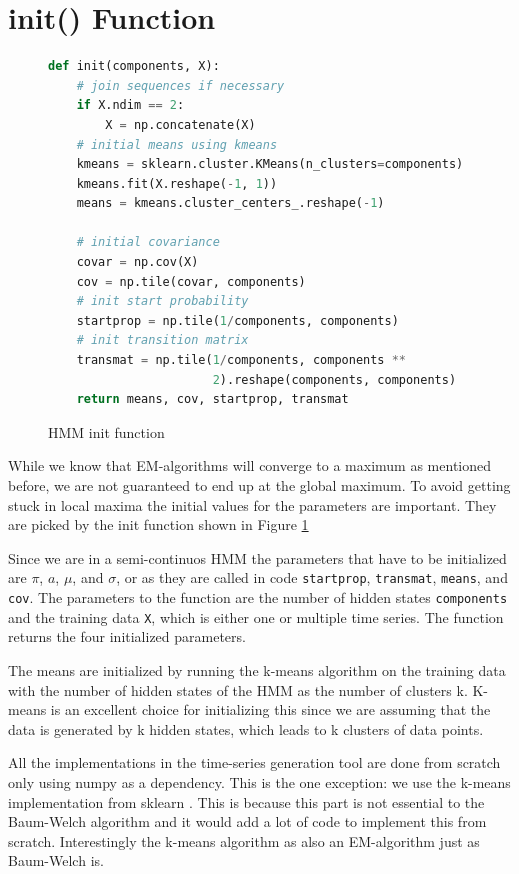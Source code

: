 \section{init() Function}

\begin{figure}
\begin{singlespace}
\begin{lstlisting}[language=Python]
def init(components, X):
    # join sequences if necessary
    if X.ndim == 2:
        X = np.concatenate(X)
    # initial means using kmeans
    kmeans = sklearn.cluster.KMeans(n_clusters=components)
    kmeans.fit(X.reshape(-1, 1))
    means = kmeans.cluster_centers_.reshape(-1)

    # initial covariance
    covar = np.cov(X)
    cov = np.tile(covar, components)
    # init start probability
    startprop = np.tile(1/components, components)
    # init transition matrix
    transmat = np.tile(1/components, components **
                       2).reshape(components, components)
    return means, cov, startprop, transmat
\end{lstlisting}
\end{singlespace}
   
\caption{HMM init function}    
\label{fig:hmm-init-listing}
\end{figure}

While we know that EM-algorithms will converge to a maximum as mentioned before, we are not guaranteed to end up at the global maximum. To avoid getting stuck in local maxima the initial values for the parameters are important. They are picked by the init function shown in Figure \ref{fig:hmm-init-listing}

Since we are in a semi-continuos HMM the parameters that have to be initialized are $\pi$, $a$, $\mu$, and $\sigma$, or as they are called in code \texttt{startprop}, \texttt{transmat}, \texttt{means}, and \texttt{cov}. The parameters to the function are the number of hidden states \texttt{components} and the training data \texttt{X}, which is either one or multiple time series. The function returns the four initialized parameters. 

The means are initialized by running the k-means algorithm on the training data with the number of hidden states of the HMM as the number of clusters k. K-means is an excellent choice for initializing this since we are assuming that the data is generated by k hidden states, which leads to k clusters of data points. 

All the implementations in the time-series generation tool are done from scratch only using numpy as a dependency. This is the one exception: we use the k-means implementation from sklearn \parencite{pedregosa2011scikit}.  This is because this part is not essential to the Baum-Welch algorithm and it would add a lot of code to implement this from scratch. Interestingly the k-means algorithm as also an EM-algorithm just as Baum-Welch is. 

